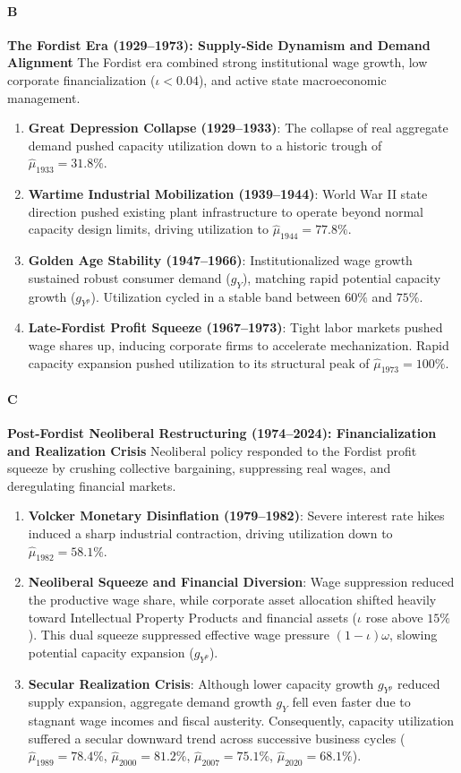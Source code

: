\paragraph{B}
\textbf{The Fordist Era (1929–1973): Supply-Side Dynamism and Demand Alignment}
The Fordist era combined strong institutional wage growth, low corporate financialization ($\iota < 0.04$), and active state macroeconomic management.

\begin{enumerate}
	\item \textbf{Great Depression Collapse (1929–1933)}: The collapse of real aggregate demand pushed capacity utilization down to a historic trough of $\hat{\mu}_{1933} = 31.8\%$.
	\item \textbf{Wartime Industrial Mobilization (1939–1944)}: World War II state direction pushed existing plant infrastructure to operate beyond normal capacity design limits, driving utilization to $\hat{\mu}_{1944} = 77.8\%$.
	\item \textbf{Golden Age Stability (1947–1966)}: Institutionalized wage growth sustained robust consumer demand ($g_Y$), matching rapid potential capacity growth ($g_{Y^p}$). Utilization cycled in a stable band between $60\%$ and $75\%$.
	\item \textbf{Late-Fordist Profit Squeeze (1967–1973)}: Tight labor markets pushed wage shares up, inducing corporate firms to accelerate mechanization. Rapid capacity expansion pushed utilization to its structural peak of $\hat{\mu}_{1973} = 100\%$.
\end{enumerate}

\paragraph{C}
\textbf{Post-Fordist Neoliberal Restructuring (1974–2024): Financialization and Realization Crisis}
Neoliberal policy responded to the Fordist profit squeeze by crushing collective bargaining, suppressing real wages, and deregulating financial markets.

\begin{enumerate}
	\item \textbf{Volcker Monetary Disinflation (1979–1982)}: Severe interest rate hikes induced a sharp industrial contraction, driving utilization down to $\hat{\mu}_{1982} = 58.1\%$.
	\item \textbf{Neoliberal Squeeze and Financial Diversion}: Wage suppression reduced the productive wage share, while corporate asset allocation shifted heavily toward Intellectual Property Products and financial assets ($\iota$ rose above $15\%$). This dual squeeze suppressed effective wage pressure $(1-\iota)\omega$, slowing potential capacity expansion ($g_{Y^p}$).
	\item \textbf{Secular Realization Crisis}: Although lower capacity growth $g_{Y^p}$ reduced supply expansion, aggregate demand growth $g_Y$ fell even faster due to stagnant wage incomes and fiscal austerity. Consequently, capacity utilization suffered a secular downward trend across successive business cycles ($\hat{\mu}_{1989} = 78.4\%$, $\hat{\mu}_{2000} = 81.2\%$, $\hat{\mu}_{2007} = 75.1\%$, $\hat{\mu}_{2020} = 68.1\%$).
\end{enumerate}


